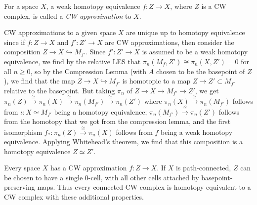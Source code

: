 \begin{definition}[CW Approximation]
    For a space $X$, a weak homotopy equivalence
    $f \colon Z \to X$, where $Z$ is a CW complex, is
    called a \textit{CW approximation} to $X$.
\end{definition}

\begin{remark}[]
    CW approximations to a given space $X$ are
    unique up to homotopy equivalence since
    if $f \colon Z \to X$ and 
    $f' \colon Z' \to X$ are CW approximations, then
    consider the composition
    $Z \to X \hookrightarrow M_{f'}$.
    Since $f' \colon Z' \to X$ is assumed to be a weak
    homotopy equivalence, we find by the relative LES that
    $\pi_n (M_f, Z') \cong \pi_n \left( X, Z' \right) = 0$ for all
    $n\ge 0$, so by 
    the Compression Lemma (with $A$ chosen to
    be the basepoint of $Z$), we
    find that the map $Z \to X \hookrightarrow M_{f'}$
    is homotopic to a map
    $Z \to Z' \subset M_{f'}$ relative
    to the basepoint.
    But taking $\pi_n$ of
    $Z \to X \to M_{f'} \to Z'$, we get
    $\pi_n(Z) \stackrel{\cong}{\to} 
    \pi_n(X) \stackrel{\cong}{\to} 
    \pi_n (M_{f'}) \stackrel{\cong}{\to}
    \pi_n \left( Z' \right)$
    where $\pi_n (X) \stackrel{\cong}{\to} \pi_n (M_{f'})$ 
    follows from $\iota \colon X \simeq M_{f'}$ being
    a homotopy equivalence;
    $\pi_n\left( M_{f'} \right) 
    \stackrel{\cong}{\to} \pi_n (Z')$ follows
    from the homotopy that we got from the compression lemma,
    and the first isomorphism
    $f_* \colon \pi_n (Z) \stackrel{\cong}{\to}  \pi_n (X)$ 
    follows from $f$ being a weak homotopy equivalence.
    Applying Whitehead's theorem, we find that this
    composition is a homotopy equivalence
    $Z \simeq Z'$.
\end{remark}

\begin{proposition}[]\label{Prop:CW-Approximation}
    Every space $X$ has a CW approximation
    $f \colon Z \to X$. If $X$ is path-connected,
    $Z$ can be chosen to have a single $0$-cell, with
    all other cells attached by basepoint-preserving maps.
    Thus every connected CW complex is homotopy equivalent to
    a CW complex with these additional properties.
\end{proposition}


